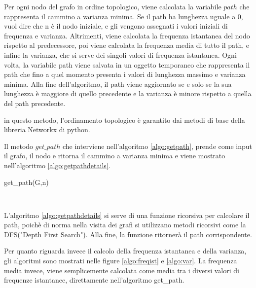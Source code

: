 Per ogni nodo del grafo in ordine topologico, viene calcolata la variabile $path$ che rappresenta il cammino a varianza minima. Se il path ha lunghezza uguale a 0, vuol dire che n è il nodo iniziale, e gli vengono assegnati i valori iniziali di frequenza e varianza. Altrimenti, viene calcolata la frequenza istantanea del nodo rispetto al predecessore, poi viene calcolata la frequenza media di tutto il path, e infine la varianza, che si serve dei singoli valori di frequenza istantanea. Ogni volta, la variabile path viene salvata in un oggetto temporaneo che rappresenta il path che fino a quel momento presenta i valori di lunghezza massimo e varianza minima. Alla fine dell'algoritmo, il path viene aggiornato se e solo se la sua lunghezza è maggiore di quello precedente e la varianza è minore rispetto a quella del path precedente.

in questo metodo, l'ordinamento topologico è garantito dai metodi di base della libreria Networkx di python.

Il metodo $get\_path$ che interviene nell'algoritmo \ref{algo:getpath}, prende come input il grafo, il nodo e ritorna il cammino a varianza minima e viene mostrato nell'algoritmo \ref{algo:getpathdetails}.
\begin{algorithm}[h]
	\caption{get_path(G,n)} \label{algo:getpathdetails}
	\begin{algorithmic}
		\EndFunction \\
				\State{\Return []}
				\EndIf	
		\EndFunction		
	\end{algorithmic}	
\end{algorithm} 

L'algoritmo \ref{algo:getpathdetails} si serve di una funzione ricorsiva per calcolare il path, poichè di norma nella visita dei grafi si utilizzano metodi ricorsivi come la DFS("Depth First Search"). Alla fine, la funzione ritornerà il path corrispondente.

Per quanto riguarda invece il calcolo della frequenza istantanea e della varianza, gli algoritmi sono mostrati nelle figure \ref{algo:freqist} e \ref{algo:var}.
La frequenza media invece, viene semplicemente calcolata come media tra i diversi valori di frequenze istantanee, direttamente nell'algoritmo get\_path.

